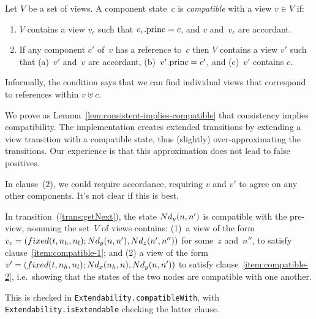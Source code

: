 \begin{definition}
\label{def:compatible}
Let $V$ be a set of views.  A component state~$c$ is \emph{compatible} with a
view $v \in V$ if:
%
\begin{enumerate}
\item\label{item:compatible-1} $V$ contains a view $v_c$ such that
$v_c.\mathrm{princ} = c$,
and $v$ and~$v_c$ are accordant.


\item\label{item:compatible-2} If any component $c'$ of~$v$ has a reference
  to~$c$ then $V$ contains a view $v'$ such that (a)~$v'$ and~$v$ are
  accordant,
  (b)~$v'.\mathrm{princ} = c'$, and (c)~$v'$ contains $c$.
\end{enumerate}
\end{definition}
%
Informally, the condition says that we can find individual views that
correspond to references within $v \uplus c$. 

We prove as Lemma~\ref{lem:consistent-implies-compatible} that consistency
implies compatibility.  The implementation creates extended transitions by
extending a view transition with a compatible state, thus (slightly)
over-approximating the transitions.  Our experience is that this approximation
does not lead to false positives.

\begin{improve}
In clause~(2), we could require accordance, requiring $v$ and $v'$ to agree on
any other components.  It's not clear if this is best. 
\end{improve}

In transition~(\ref{trans:getNext}), the state $Nd_y(n, n')$ is compatible
with the pre-view, assuming the set~$V$ of views contains: (1)~a view of the
form $v_c = (fixed(t, n_h, n_l);\linebreak[1] \Node_y(n, n'), \linebreak[1]
\Node_z(n', n''))$ for some~$z$ and~$n''$, to satisfy
clause~\ref{item:compatible-1}; and (2) a view of the form $v' = (fixed(t,
n_h, n_l); \Node_x(n_h, n), \linebreak[1] \Node_y(n, n'))$ to satisfy
clause~\ref{item:compatible-2}, i.e.~showing that the states of the two nodes
are compatible with one another.

\begin{impNote}
This is checked in
  \texttt{Extendability.\linebreak[1]compatible\-With}, with
  \texttt{Extendability.isExtendable} checking the latter clause.
\end{impNote}

